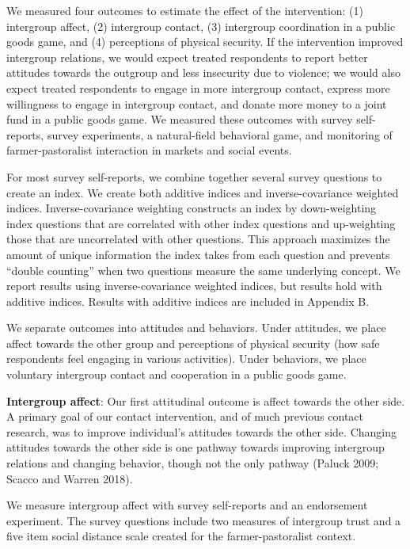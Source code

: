 \documentclass[11pt]{article}
\begin{document}
We measured four outcomes to estimate the effect of the intervention:
(1) intergroup affect, (2) intergroup contact, (3) intergroup
coordination in a public goods game, and (4) perceptions of physical
security. If the intervention improved intergroup relations, we would
expect treated respondents to report better attitudes towards the
outgroup and less insecurity due to violence; we would also expect
treated respondents to engage in more intergroup contact, express more
willingness to engage in intergroup contact, and donate more money to a
joint fund in a public goods game. We measured these outcomes with
survey self-reports, survey experiments, a natural-field behavioral
game, and monitoring of farmer-pastoralist interaction in markets and
social events.

For most survey self-reports, we combine together several survey
questions to create an index. We create both additive indices and
inverse-covariance weighted indices. Inverse-covariance weighting
constructs an index by down-weighting index questions that are
correlated with other index questions and up-weighting those that are
uncorrelated with other questions. This approach maximizes the amount of
unique information the index takes from each question and prevents
``double counting'' when two questions measure the same underlying
concept. We report results using inverse-covariance weighted indices,
but results hold with additive indices. Results with additive indices
are included in Appendix B.

We separate outcomes into attitudes and behaviors. Under attitudes, we
place affect towards the other group and perceptions of physical
security (how safe respondents feel engaging in various activities).
Under behaviors, we place voluntary intergroup contact and cooperation
in a public goods game.

\textbf{Intergroup affect}: Our first attitudinal outcome is affect
towards the other side. A primary goal of our contact intervention, and
of much previous contact research, was to improve individual's attitudes
towards the other side. Changing attitudes towards the other side is one
pathway towards improving intergroup relations and changing behavior,
though not the only pathway (Paluck 2009; Scacco and Warren 2018).

We measure intergroup affect with survey self-reports and an endorsement
experiment. The survey questions include two measures of intergroup
trust and a five item social distance scale created for the
farmer-pastoralist context.
\end{document}
